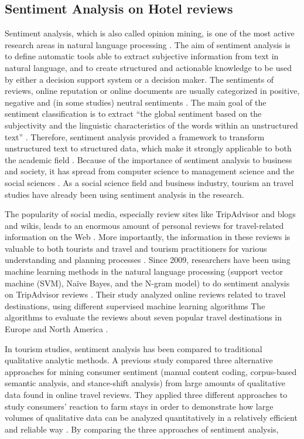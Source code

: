 \subsection{Sentiment Analysis on Hotel reviews}
Sentiment analysis, which is also called opinion mining, is one of the most active
research areas in natural language processing \cite{opinion2014}. The aim of sentiment analysis is to define automatic tools able to extract subjective information from text in natural \cite{article} language, and to create structured and actionable knowledge to be used by either a decision support system or a decision maker. The sentiments of reviews, online reputation or online documents are usually categorized in positive, negative and (in some studies) neutral sentiments \cite{Garcia2012}. The main goal of the sentiment classification is to extract ``the global sentiment based on the subjectivity and the linguistic characteristics of the words within an unstructured text'' \cite{Garcia2012}. Therefore, sentiment analysis provided a framework to transform unstructured text to structured data, which make it strongly applicable to both the academic field \cite{Cam2013}. Because of the importance of sentiment analysis to business and society, it has spread from computer science to management science and the social sciences \cite{Pozzi}. As a social science field and business industry, tourism an travel studies have already been using sentiment analysis in the research.

The popularity of social media, especially review sites like TripAdvisor and blogs and wikis, leads to an enormous amount of personal reviews for travel-related information on the Web \cite{opinion2014}. More importantly, the information in these reviews is valuable to both tourists and travel and tourism practitioners for various understanding and planning processes \cite{YE20096527}. Since 2009, researchers have been using machine learning methods in the natural language processing (support vector machine (SVM), Naïve Bayes, and the N-gram model) to do sentiment analysis on TripAdvisor reviews \cite{YE20096527}. Their study analyzed online reviews related to travel destinations, using different supervised machine learning algorithms The
algorithms to evaluate the reviews about seven popular travel destinations in Europe and North America \cite{YE20096527}. 

In tourism studies, sentiment analysis has been compared to traditional qualitative analytic methods. A previous study compared three alternative approaches for mining consumer sentiment (manual content coding, corpus-based semantic analysis, and stance-shift analysis) from large amounts of qualitative data found in online travel reviews.  They applied three different approaches to study consumers' reaction to farm stays in order to demonstrate how large volumes of qualitative data can be analyzed quantitatively in a relatively efficient and reliable way \cite{Farm}. By comparing the three approaches of sentiment analysis, 


